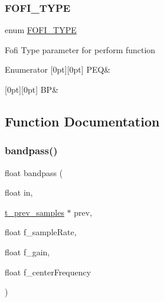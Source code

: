 \subsubsection{\texorpdfstring{FOFI\_TYPE}{FOFI\_TYPE}}
{\footnotesize\ttfamily enum \mbox{\hyperlink{fofi~_8c_ae6be347e31c48fcae5108f6db7a8bcfd}{F\+O\+F\+I\+\_\+\+T\+Y\+PE}}}

Fofi Type parameter for perform function \begin{DoxyEnumFields}{Enumerator}
[0pt][0pt]{}\mbox{\label{fofi~_8c_ae6be347e31c48fcae5108f6db7a8bcfda4579b52acef1f8eda7cbb6a2337346b0}} 
P\+EQ&\\
\hline

[0pt][0pt]{}\mbox{\label{fofi~_8c_ae6be347e31c48fcae5108f6db7a8bcfdaf5a5119c2b95cc7f4f3e20f56576ee3e}} 
BP&\\
\hline

\end{DoxyEnumFields}


\subsection{Function Documentation}
\mbox{\label{fofi~_8c_a79bf4da8324cab6a31c4439c746821d8}} 
\subsubsection{\texorpdfstring{bandpass()}{bandpass()}}
{\footnotesize\ttfamily float bandpass (\begin{DoxyParamCaption}\item[{float}]{in,  }\item[{\mbox{\hyperlink{fofi~_8h_a728138bbe23514a1927f1f686090cd52}{t\+\_\+prev\+\_\+samples}} $\ast$}]{prev,  }\item[{float}]{f\+\_\+sample\+Rate,  }\item[{float}]{f\+\_\+gain,  }\item[{float}]{f\+\_\+center\+Frequency }\end{DoxyParamCaption})}



